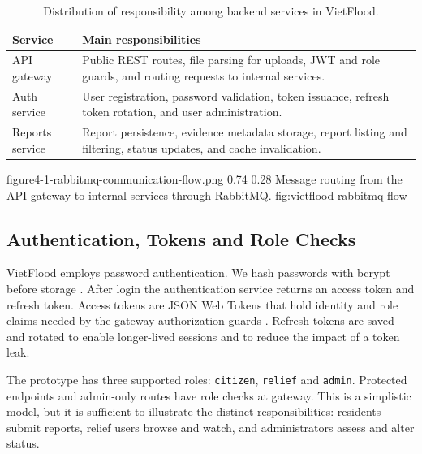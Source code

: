 \begin{table}[htbp]
\centering
\caption{Distribution of responsibility among backend services in VietFlood.}
\label{tab:service-roles-vietflood}
\footnotesize
\setlength{\tabcolsep}{5pt}
\renewcommand{\arraystretch}{1.2}
\begin{tabular}{|p{3.0cm}|p{9.4cm}|}
\hline
\textbf{Service} & \textbf{Main responsibilities} \\
\hline
API gateway & Public REST routes, file parsing for uploads, JWT and role guards, and routing requests to internal services. \\
\hline
Auth service & User registration, password validation, token issuance, refresh token rotation, and user administration. \\
\hline
Reports service & Report persistence, evidence metadata storage, report listing and filtering, status updates, and cache invalidation. \\
\hline
\end{tabular}
\end{table}

\vfplaceholderfigure
{figure4-1-rabbitmq-communication-flow.png}
{0.74}
{0.28}
{Message routing from the API gateway to internal services through RabbitMQ.}
{fig:vietflood-rabbitmq-flow}

\FloatBarrier
\subsection{Authentication, Tokens and Role Checks}

VietFlood employs password authentication. We hash passwords with bcrypt before storage \cite{provos1999bcrypt}. After login the authentication service returns an access token and refresh token. Access tokens are JSON Web Tokens that hold identity and role claims needed by the gateway authorization guards \cite{jones2015jwt}. Refresh tokens are saved and rotated to enable longer-lived sessions and to reduce the impact of a token leak.

The prototype has three supported roles: \texttt{citizen}, \texttt{relief} and \texttt{admin}. Protected endpoints and admin-only routes have role checks at gateway. This is a simplistic model, but it is sufficient to illustrate the distinct responsibilities: residents submit reports, relief users browse and watch, and administrators assess and alter status.

